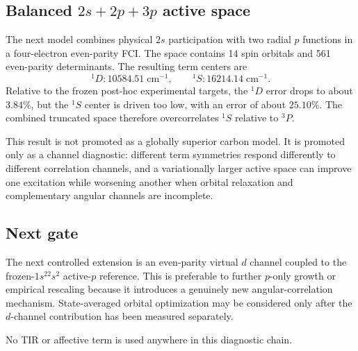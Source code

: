 \subsection{Balanced $2s+2p+3p$ active space}
The next model combines physical $2s$ participation with two radial $p$ functions in a four-electron even-parity FCI.  The space contains 14 spin orbitals and 561 even-parity determinants.  The resulting term centers are
\begin{equation}
^1D:10584.51\;\mathrm{cm^{-1}},\qquad
^1S:16214.14\;\mathrm{cm^{-1}}.
\end{equation}
Relative to the frozen post-hoc experimental targets, the $^1D$ error drops to about $3.84\%$, but the $^1S$ center is driven too low, with an error of about $25.10\%$.  The combined truncated space therefore overcorrelates $^1S$ relative to $^3P$.

This result is not promoted as a globally superior carbon model.  It is promoted only as a channel diagnostic: different term symmetries respond differently to different correlation channels, and a variationally larger active space can improve one excitation while worsening another when orbital relaxation and complementary angular channels are incomplete.

\subsection{Next gate}
The next controlled extension is an even-parity virtual $d$ channel coupled to the frozen-$1s^22s^2$ active-$p$ reference.  This is preferable to further $p$-only growth or empirical rescaling because it introduces a genuinely new angular-correlation mechanism.  State-averaged orbital optimization may be considered only after the $d$-channel contribution has been measured separately.

No TIR or affective term is used anywhere in this diagnostic chain.
